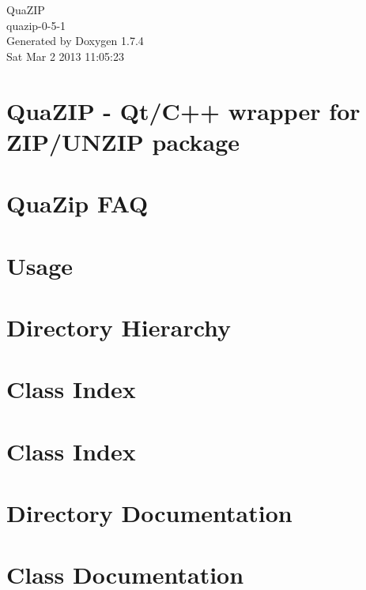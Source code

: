 \documentclass[a4paper]{book}
\begin{document}
\begin{titlepage}
\vspace*{7cm}
\begin{center}
{\Large QuaZIP \\[1ex]\large quazip-\/0-\/5-\/1 }\\
\vspace*{1cm}
{\large Generated by Doxygen 1.7.4}\\
\vspace*{0.5cm}
{\small Sat Mar 2 2013 11:05:23}\\
\end{center}
\end{titlepage}
\clearemptydoublepage
{}
\tableofcontents
\clearemptydoublepage
{}
\chapter{QuaZIP -\/ Qt/C++ wrapper for ZIP/UNZIP package}
\label{index}
\chapter{QuaZip FAQ}
\label{faq}

\chapter{Usage}
\label{usage}

\chapter{Directory Hierarchy}

\chapter{Class Index}

\chapter{Class Index}

\chapter{Directory Documentation}

\chapter{Class Documentation}













\printindex
\end{document}
